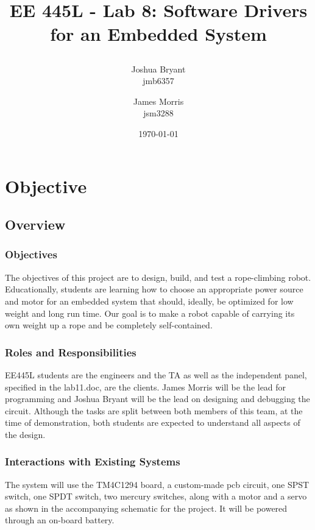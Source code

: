 \documentclass{article}
\title{\begin{LARGE}
	\textbf{EE 445L - Lab 8: Software Drivers for an Embedded System}
\end{LARGE}} %
\author{Joshua Bryant \\ jmb6357 \and James Morris \\ jsm3288} %
\date{\today} %
\begin{document}
\maketitle %


\section{Objective}

	\subsection{Overview}

		\subsubsection{Objectives}
		The objectives of this project are to design, build, and test a rope-climbing robot. Educationally, students are learning how to choose an appropriate power source and motor for an embedded system that should, ideally, be optimized for low weight and long run time. Our goal is to make a robot capable of carrying its own weight up a rope and be completely self-contained.


		\subsubsection{Roles and Responsibilities}
		EE445L students are the engineers and the TA as well as the independent panel, specified in the lab11.doc, are the clients. James Morris will be the lead for programming and Joshua Bryant will be the lead on designing and debugging the circuit. Although the tasks are split between both members of this team, at the time of demonstration, both students are expected to understand all aspects of the design.
	
		\subsubsection{Interactions with Existing Systems}
		The system will use the TM4C1294 board, a custom-made pcb circuit, one SPST switch, one SPDT switch, two mercury switches, along with a motor and a servo as shown in the accompanying schematic for the project. It will be powered through an on-board battery.	
\end{document}
